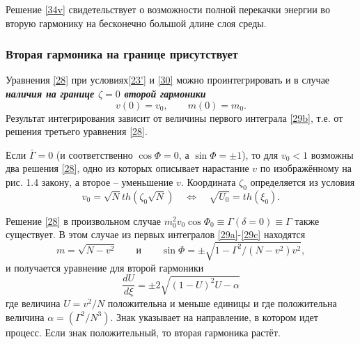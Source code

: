\documentclass[a4paper]{article}
\begin{document}
	Решение \eqref{34v} свидетельствует о возможности полной перекачки энергии во вторую гармонику на бесконечно большой длине слоя среды. 
	\subsubsection{Вторая гармоника на границе присутствует}
	Уравнения \eqref{28} при условиях\eqref{23'} и \eqref{30} можно проинтегрировать и в случае \textit{\textbf{наличия на границе $\zeta=0$ второй гармоники }}
	\setcounter{equation}{34}
	\begin{equation}
		v(0)=v_{0},\qquad m(0)=m_{0}.\label{35}
	\end{equation}
	Результат интегрирования зависит от величины первого интеграла \eqref{29b}, т.е. от решения третьего уравнения \eqref{28}. 
	
	Если $\bar{\Gamma}=0$ (и соответственно $\cos\Phi=0$, а $\sin\Phi=\pm1$), то для $v_{0}<1$ возможны два решения \eqref{28}, одно из которых описывает нарастание $v$ по изображённому на рис. 1.4 закону, а второе – уменьшение $v$. Координата $\zeta_{0}$ определяется из условия $$v_{0}=\sqrt{N}th(\zeta_{0}\sqrt{N})\quad\iff\quad\sqrt{U_{0}}=th(\xi_{0}).$$
	
	Решение \eqref{28} в произвольном случае $m_{0}^{2}v_{0}\cos\Phi_{0}\equiv\Gamma(\delta=0)\equiv\Gamma$ также существует. В этом случае из первых интегралов \eqref{29a}-\eqref{29c} находятся 
	$$m=\sqrt{N-v^{2}}\qquad\text{и}\qquad\sin\Phi=\pm\sqrt{1-\Gamma^{2}/(N-v^{2})v^{2}},$$ и получается уравнение для второй гармоники 
	\begin{equation}
		\frac{dU}{d\xi}=\pm2\sqrt{(1-U)^{2}U-\alpha}\label{36}
	\end{equation}
	где величина $U=v^{2}/N$ положительна и меньше единицы и где положительна величина $\alpha=(\Gamma^{2}/N^{3})$. Знак указывает на направление, в котором идет процесс. Если знак положительный, то вторая гармоника растёт. 
	
\end{document}
